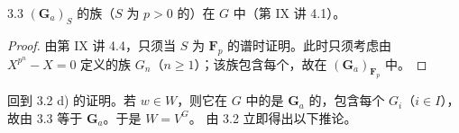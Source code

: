 \begin{SGAresult}{}{3.3}
$(\mathbf G_a)_S$ 的族（$S$ 为 $p>0$ 的）在 $G$ 中（第 IX 讲 4.1）。
\end{SGAresult}
\begin{proof}
由第 IX 讲 4.4，只须当 $S$ 为 $\mathbf F_p$ 的谱时证明。此时只须考虑由 $X^{p^n}-X=0$ 定义的族 $G_n$（$n\geq1$）；该族包含每个，故在 $(\mathbf G_a)_{\mathbf F_p}$ 中。
\end{proof}
回到 3.2 d) 的证明。若 $w\in W$，则它在 $G$ 中的是 $\mathbf G_a$ 的，包含每个 $G_i$（$i\in I$），故由 3.3 等于 $\mathbf G_a$。于是 $W=V^G$。
由 3.2 立即得出以下推论。

